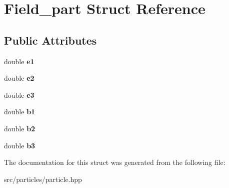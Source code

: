 \hypertarget{struct_field__part}{}\section{Field\+\_\+part Struct Reference}
\label{struct_field__part}
\subsection*{Public Attributes}
\begin{DoxyCompactItemize}
\item 
\hypertarget{struct_field__part_a88cbf49b8585552707cc4d2b4fb72745}{}\label{struct_field__part_a88cbf49b8585552707cc4d2b4fb72745} 
double {\bfseries e1}
\item 
\hypertarget{struct_field__part_ae956ea9079af38e4eaafb7b00f317ce9}{}\label{struct_field__part_ae956ea9079af38e4eaafb7b00f317ce9} 
double {\bfseries e2}
\item 
\hypertarget{struct_field__part_a6a892083caadc7e684af6bdc9e0e4cb9}{}\label{struct_field__part_a6a892083caadc7e684af6bdc9e0e4cb9} 
double {\bfseries e3}
\item 
\hypertarget{struct_field__part_a3d9f01728f0f1ce0a706e55186680734}{}\label{struct_field__part_a3d9f01728f0f1ce0a706e55186680734} 
double {\bfseries b1}
\item 
\hypertarget{struct_field__part_a0758e5f57a7a07d325a0ac477a263da6}{}\label{struct_field__part_a0758e5f57a7a07d325a0ac477a263da6} 
double {\bfseries b2}
\item 
\hypertarget{struct_field__part_a72a1f1e86c0a26aae9b01fc827c8852f}{}\label{struct_field__part_a72a1f1e86c0a26aae9b01fc827c8852f} 
double {\bfseries b3}
\end{DoxyCompactItemize}


The documentation for this struct was generated from the following file\+:\begin{DoxyCompactItemize}
\item 
src/particles/particle.\+hpp\end{DoxyCompactItemize}
